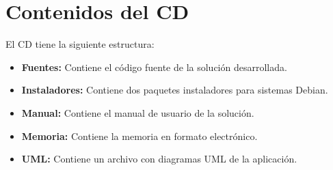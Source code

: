 
\appendix

\chapter{Contenidos del CD}


El CD tiene la siguiente estructura: 
\begin{itemize}
    \item {\bfseries Fuentes:} Contiene el código fuente de la solución desarrollada.
    \item {\bfseries Instaladores:} Contiene dos paquetes instaladores para sistemas Debian.
    \item {\bfseries Manual:} Contiene el manual de usuario de la solución.
    \item {\bfseries Memoria:} Contiene la memoria en formato electrónico.
    \item {\bfseries UML:} Contiene un archivo con diagramas UML de la aplicación.
\end{itemize}